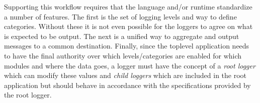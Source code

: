 Supporting this workflow requires that the language and/or runtime standardize 
a number of features. The first is the set of logging levels and way to define 
categories. Without these it is not even possible for the loggers to agree on 
what is expected to be output. The next is a unified way to aggregate and output 
messages to a common destination. Finally, since the toplevel application needs 
to have the final authority over which levels/categories are enabled for which 
modules and where the data goes, a logger must have the concept of a 
\emph{root logger} which can modify these values and \emph{child loggers} which 
are included in the root application but should behave in accordance with the 
specifications provided by the root logger.
